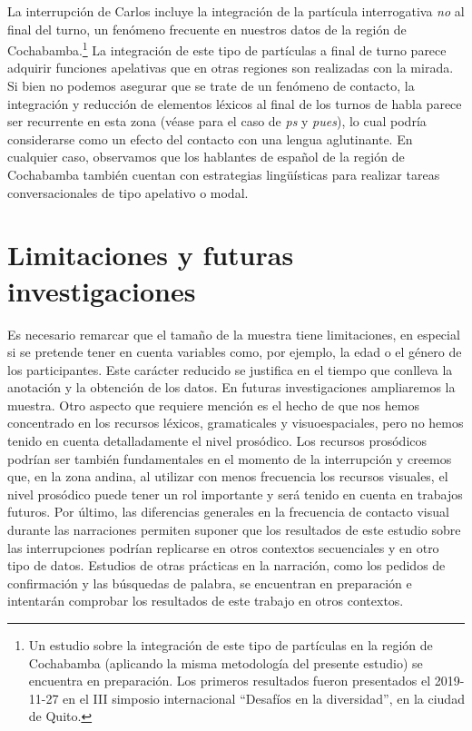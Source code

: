 \documentclass[output=paper]{../langscibook}
\begin{document}
La interrupción de Carlos incluye la integración de la partícula interrogativa \textit{no} al final del turno, un fenómeno frecuente en nuestros datos de la región de Cochabamba.\footnote{Un estudio sobre la integración de este tipo de partículas en la región de Cochabamba (aplicando la misma metodología del presente estudio) se encuentra en preparación. Los primeros resultados fueron presentados el 2019-11-27 en el III simposio internacional “Desafíos en la diversidad”, en la ciudad de Quito.}  La integración de este tipo de partículas a final de turno parece adquirir funciones apelativas que en otras regiones son realizadas con la mirada. Si bien no podemos asegurar que se trate de un fenómeno de contacto, la integración y reducción de elementos léxicos al final de los turnos de habla parece ser recurrente en esta zona (véase \citealt{SotoRodríguez2013} para el caso de \textit{ps} y \textit{pues}), lo cual podría considerarse como un efecto del contacto con una lengua aglutinante. En cualquier caso, observamos que los hablantes de español de la región de Cochabamba también cuentan con estrategias lingüísticas para realizar tareas conversacionales de tipo apelativo o modal.

\section{Limitaciones y futuras investigaciones}\label{sec:satti:4}

Es necesario remarcar que el tamaño de la muestra tiene limitaciones, en especial si se pretende tener en cuenta variables como, por ejemplo, la edad o el género de los participantes. Este carácter reducido se justifica en el tiempo que conlleva la anotación y la obtención de los datos. En futuras investigaciones ampliaremos la muestra. Otro aspecto que requiere mención es el hecho de que nos hemos concentrado en los recursos léxicos, gramaticales y visuoespaciales, pero no hemos tenido en cuenta detalladamente el nivel prosódico. Los recursos prosódicos podrían ser también fundamentales en el momento de la interrupción y creemos que, en la zona andina, al utilizar con menos frecuencia los recursos visuales, el nivel prosódico puede tener un rol importante y será tenido en cuenta en trabajos futuros. Por último, las diferencias generales en la frecuencia de contacto visual durante las narraciones permiten suponer que los resultados de este estudio sobre las interrupciones podrían replicarse en otros contextos secuenciales y en otro tipo de datos. Estudios de otras prácticas en la narración, como los pedidos de confirmación y las búsquedas de palabra, se encuentran en preparación e intentarán comprobar los resultados de este trabajo en otros contextos.
\end{document}
